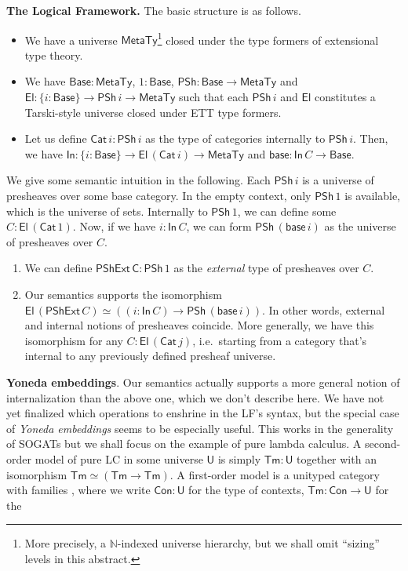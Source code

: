 \documentclass{easychair}
\newcommand{\msf}[1]{{\mathsf{#1}}}
\newcommand{\mbb}[1]{\mathbb{#1}}
\newcommand{\MetaTy}{\msf{MetaTy}}
\newcommand{\Base}{\msf{Base}}
\newcommand{\PSh}{\msf{PSh}}
\newcommand{\El}{\msf{El}}
\newcommand{\Cat}{\msf{Cat}}
\newcommand{\In}{\msf{In}}
\newcommand{\base}{\msf{base}}
\newcommand{\Tm}{\msf{Tm}}
\newcommand{\U}{\msf{U}}
\newcommand{\Con}{\msf{Con}}
\begin{document}
\noindent\textbf{The Logical Framework.} The basic structure is as follows.
\begin{itemize}
\item We have a universe $\MetaTy$\footnote{More precisely, a $\mbb{N}$-indexed universe
hierarchy, but we shall omit ``sizing'' levels in this abstract.} closed under the type formers
  of extensional type theory.
\item We have $\Base : \MetaTy$, $1 : \Base$, $\PSh : \Base \to \MetaTy$ and $\El : \{i :
  \Base\} \to \PSh\,i \to \MetaTy$ such that each $\PSh\,i$ and $\El$ constitutes
  a Tarski-style universe closed under ETT type formers.
\item Let us define $\Cat\,i : \PSh\,i$ as the type of categories internally to
  $\PSh\,i$. Then, we have $\In : \{i : \Base\} \to \El\,(\Cat\,i) \to \MetaTy$ and $\msf{base} : \In\,C \to \Base$.
\end{itemize}
We give some semantic intuition in the following. Each $\PSh\,i$ is a universe
of presheaves over some base category. In the empty context, only $\PSh\,1$ is
available, which is the universe of sets. Internally to $\PSh\,1$, we can define
some $C : \El\,(\Cat\,1)$. Now, if we have $i : \In\,C$, we can form $\PSh\,(\base\,i)$
as the universe of presheaves over $C$.
\begin{enumerate}
\item We can define $\msf{PShExt\,C} : \PSh\,1$ as the \emph{external} type of presheaves over $C$.
\item Our semantics supports the isomorphism $\El\,(\msf{PShExt}\,C) \simeq ((i
  : \In\,C) \to \PSh\,(\base\,i))$.  In other words, external and internal
  notions of presheaves coincide. More generally, we have this isomorphism for
  any $C : \El\,(\Cat\,j)$, i.e.\ starting from a category that's internal to any
  previously defined presheaf universe.
\end{enumerate}
\textbf{Yoneda embeddings}. Our semantics actually supports a more general
notion of internalization than the above one, which we don't describe here. We
have not yet finalized which operations to enshrine in the LF's syntax, but the
special case of \emph{Yoneda embeddings} seems to be especially useful. This
works in the generality of SOGATs but we shall focus on the example of pure
lambda calculus. A second-order model of pure LC in some universe $\U$ is simply
$\Tm : \U$ together with an isomorphism $\Tm \simeq (\Tm \to \Tm)$. A
first-order model is a unityped category with families \cite{cwfs}, where we
write $\msf{Con} : \U$ for the type of contexts, $\Tm : \Con \to \U$ for the
\end{document}
